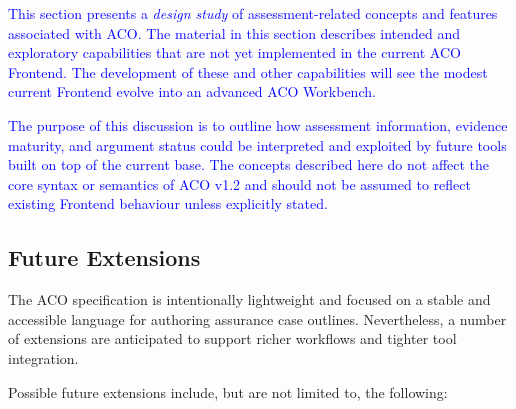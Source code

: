\documentclass[11pt,twoside,a4paper]{article}
\begin{document}
\textcolor{blue}{This section presents a \emph{design study} of assessment-related concepts and features associated with ACO. The material in this section describes intended and
exploratory capabilities that are not yet implemented in the current ACO Frontend.
The development of these and other capabilities will see the modest current Frontend evolve into an advanced ACO Workbench.}

\textcolor{blue}{The purpose of this discussion is to outline how assessment information, evidence
maturity, and argument status could be interpreted and exploited by future tools
built on top of the current base. The concepts described here do not affect the core
syntax or semantics of ACO v1.2 and should not be assumed to reflect existing
Frontend behaviour unless explicitly stated.}

\subsection{Future Extensions}
\label{sec:future-extensions}

The ACO specification is intentionally lightweight and focused on a stable
and accessible language for authoring assurance case outlines. Nevertheless, a number
of extensions are anticipated to support richer workflows and tighter tool
integration.

Possible future extensions include, but are not limited to, the following:
\end{document}

